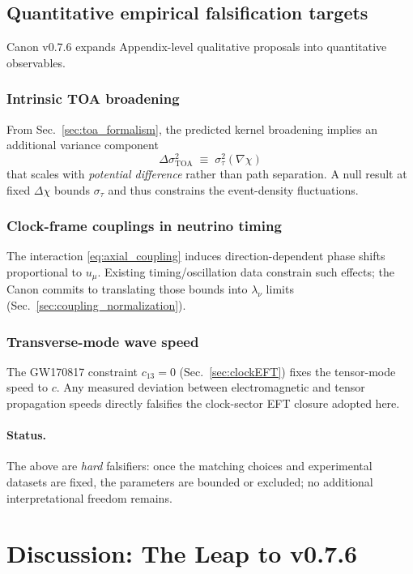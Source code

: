 \documentclass[10pt]{article}
\begin{document}
\subsection{Quantitative empirical falsification targets}
\label{sec:quant_falsifiers}

Canon v0.7.6 expands Appendix-level qualitative proposals into quantitative observables.

\subsubsection{Intrinsic TOA broadening}
From Sec.~\ref{sec:toa_formalism}, the predicted kernel broadening implies an additional variance
component
\begin{equation}
\Delta\sigma_{\mathrm{TOA}}^2 \;\equiv\; \sigma_\tau^2(\nabla\chi)
\end{equation}
that scales with \emph{potential difference} rather than path separation. A null result at fixed
$\Delta\chi$ bounds $\sigma_\tau$ and thus constrains the event-density fluctuations.

\subsubsection{Clock-frame couplings in neutrino timing}
The interaction \eqref{eq:axial_coupling} induces direction-dependent phase shifts proportional
to $u_\mu$. Existing timing/oscillation data constrain such effects; the Canon commits to translating
those bounds into $\lambda_\nu$ limits (Sec.~\ref{sec:coupling_normalization}).

\subsubsection{Transverse-mode wave speed}
The GW170817 constraint $c_{13}=0$ (Sec.~\ref{sec:clockEFT}) fixes the tensor-mode speed to $c$.
Any measured deviation between electromagnetic and tensor propagation speeds directly falsifies the
clock-sector EFT closure adopted here.

\paragraph{Status.}
The above are \emph{hard} falsifiers: once the matching choices and experimental datasets are fixed,
the parameters are bounded or excluded; no additional interpretational freedom remains.

\section{Discussion: The Leap to v0.7.6}
\end{document}
